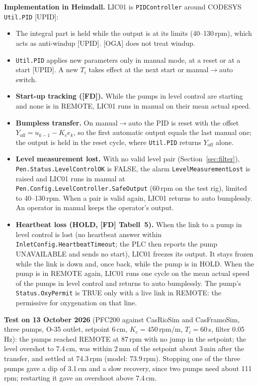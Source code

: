 \documentclass[11pt]{article}
\begin{document}
\textbf{Implementation in Heimdall.} LIC01 is \texttt{PIDController} around CODESYS
\texttt{Util.PID} [UPID]:
\begin{itemize}
  \item The integral part is held while the output is at its limits (40--130\,rpm), which acts as
        anti-windup [UPID]. [OGA] does not treat windup.
  \item \texttt{Util.PID} applies new parameters only in manual mode, at a reset or at a start
        [UPID]. A new $T_i$ takes effect at the next start or manual$\to$auto switch.
  \item \textbf{Start-up tracking ([FD]).} While the pumps in level control are starting and
        none is in REMOTE, LIC01 runs in manual on their mean actual speed.
  \item \textbf{Bumpless transfer.} On manual$\to$auto the PID is reset with the offset
        $Y_\text{off} = u_{k-1} - K_c e_k$, so the first automatic output equals the last manual
        one; the output is held in the reset cycle, where \texttt{Util.PID} returns
        $Y_\text{off}$ alone.
  \item \textbf{Level measurement lost.} With no valid level pair (Section~\ref{sec:filter}),
        \texttt{Pen.Status.LevelControlOK} is FALSE, the alarm \texttt{LevelMeasurementLost} is
        raised and LIC01 runs in manual at \texttt{Pen.Config.LevelController.SafeOutput}
        (60\,rpm on the test rig), limited to 40--130\,rpm. When a pair is valid again, LIC01
        returns to auto bumplessly. An operator in manual keeps the operator's output.
  \item \textbf{Heartbeat loss (HOLD, [FD] Tabell~5).} When the link to a pump in level control
        is lost (no heartbeat answer within \texttt{InletConfig.HeartbeatTimeout}; the PLC then
        reports the pump UNAVAILABLE and sends no start), LIC01 freezes its output. It stays frozen
        while the link is down and, once back, while the pump is in HOLD. When the pump is in
        REMOTE again, LIC01 runs one cycle on the mean actual speed of the pumps in level control
        and returns to auto bumplessly. The pump's \texttt{Status.OxyPermit} is TRUE only
        with a live link in REMOTE: the permissive for oxygenation on that line.
\end{itemize}
\textbf{Test on 13 October 2026} (PFC200 against CasRioSim and CasFramoSim, three pumps, O-35
outlet, setpoint 6\,cm, $K_c = 450$\,rpm/m, $T_i = 60$\,s, filter 0.05\,Hz): the pumps reached
REMOTE at 87\,rpm with no jump in the setpoint; the level overshot to 7.4\,cm, was within 2\,mm
of the setpoint about 3\,min after the transfer, and settled at 74.3\,rpm (model: 73.9\,rpm).
Stopping one of the three pumps gave a dip of 3.1\,cm and a slow recovery, since two pumps need
about 111\,rpm; restarting it gave an overshoot above 7.4\,cm.
\end{document}

